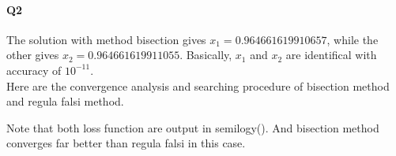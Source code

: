 \documentclass[11pt]{article}
\begin{document}
\paragraph{Q2}
The solution with method bisection gives $x_1=0.964661619910657$, while the other gives $x_2=0.964661619911055$. Basically, $x_1$ and $x_2$ are identifical with accuracy of $10^{-11}$.\\
Here are the convergence analysis and searching procedure of bisection method and regula falsi method.
\begin{figure}[H]
	\centering
\centering
{}
\end{figure}
Note that both loss function are output in semilogy(). And bisection method converges far better than regula falsi in this case.
\end{document}
